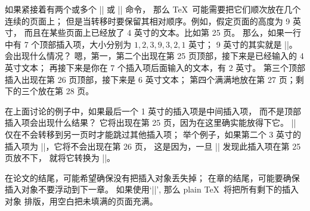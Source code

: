 \danger 如果紧接着有两个或多个 |\topinsert| 或 |\pageinsert| 命令，
那么 \TeX\ 可能需要把它们顺次放在几个连续的页面上；
但是当转移时要保留其相对顺序。例如，假定页面的高度为 9 英寸，
而且在某些页面上已经放了 4 英寸的文本。比如第 25 页。%
那么，如果一行中有 7 个顶部插入项，大小分别为 $1,2,3,9,3,2,1$ 英寸；
9 英寸的其实就是 |\pageinsert|。会出现什么情况？
嗯，第一，第二个出现在第 25 页顶部，接下来是已经输入的 4 英寸文本；
再接下来是你在 7 个插入项后面输入的文本，有 2 英寸。%
第三个顶部插入出现在第 26 页顶部，接下来是 6 英寸文本；
第四个满满地放在第 27 页；剩下的三个放在第 28 页。

\dangerexercise 在上面讨论的例子中，如果最后一个 1 英寸的插入项是中间插入项，
而不是顶部插入项会出现什么结果？
\answer 它将出现在第 25 页，因为在这里确实能放得下它。
|\midinsert| 仅在不会转移到另一页时才能跳过其他插入项；
举个例子，如果第二个 3 英寸的插入项为 |\midinsert|，它将不会出现在第 26 页，
这是因为，一旦 |\midinsert| 发现此插入项在第 25 页放不下，
就将它转换为 |\topinsert|。

\danger 在论文的结尾，可能希望确保没有把插入对象丢失掉；
在章的结尾，可能要确保插入对象不要浮动到下一章。%
如果使用`|\vfill\supereject|', 那么 plain \TeX\ 将把所有剩下的插入对象%
排版，用空白把未填满的页面充满。


